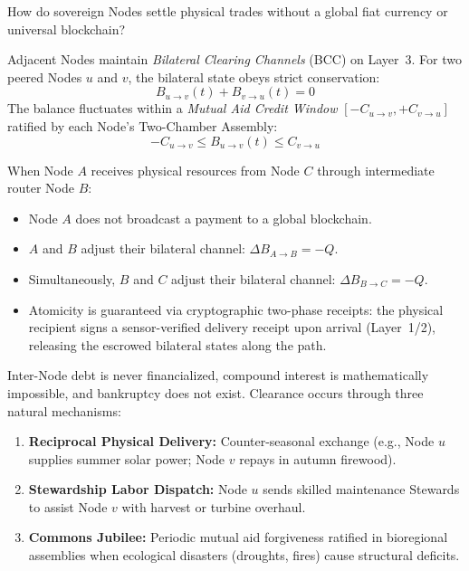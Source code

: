 How do sovereign Nodes settle physical trades without a global fiat currency or universal blockchain?

Adjacent Nodes maintain \textit{Bilateral Clearing Channels} (BCC) on Layer~3. For two peered Nodes $u$ and $v$, the bilateral state obeys strict conservation:
\begin{equation}
B_{u \to v}(t) + B_{v \to u}(t) = 0
\label{eq:channel_conservation}
\end{equation}
The balance fluctuates within a \textit{Mutual Aid Credit Window} $[-C_{u \to v}, +C_{v \to u}]$ ratified by each Node's Two-Chamber Assembly:
\begin{equation}
-C_{u \to v} \le B_{u \to v}(t) \le C_{v \to u}
\label{eq:credit_window}
\end{equation}

When Node $A$ receives physical resources from Node $C$ through intermediate router Node $B$:
\begin{itemize}
  \item Node $A$ does not broadcast a payment to a global blockchain.
  \item $A$ and $B$ adjust their bilateral channel: $\Delta B_{A \to B} = -Q$.
  \item Simultaneously, $B$ and $C$ adjust their bilateral channel: $\Delta B_{B \to C} = -Q$.
  \item Atomicity is guaranteed via cryptographic two-phase receipts: the physical recipient signs a sensor-verified delivery receipt upon arrival (Layer~1/2), releasing the escrowed bilateral states along the path.
\end{itemize}

Inter-Node debt is never financialized, compound interest is mathematically impossible, and bankruptcy does not exist. Clearance occurs through three natural mechanisms:
\begin{enumerate}
  \item \textbf{Reciprocal Physical Delivery:} Counter-seasonal exchange (e.g., Node $u$ supplies summer solar power; Node $v$ repays in autumn firewood).
  \item \textbf{Stewardship Labor Dispatch:} Node $u$ sends skilled maintenance Stewards to assist Node $v$ with harvest or turbine overhaul.
  \item \textbf{Commons Jubilee:} Periodic mutual aid forgiveness ratified in bioregional assemblies when ecological disasters (droughts, fires) cause structural deficits.
\end{enumerate}

